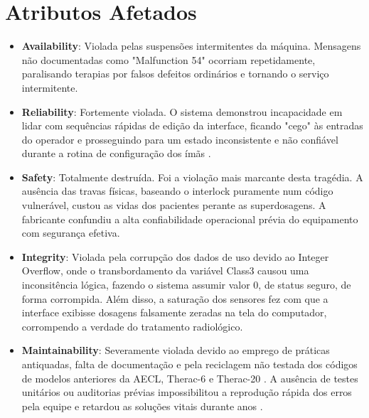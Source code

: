 \documentclass[12pt,a4paper]{article}
\begin{document}
\section*{Atributos Afetados}
\begin{itemize}
    \item \textbf{Availability}: Violada pelas suspensões intermitentes da máquina. Mensagens não documentadas como "Malfunction 54" ocorriam repetidamente, paralisando terapias por falsos defeitos ordinários e tornando o serviço intermitente.  
    \item \textbf{Reliability}: Fortemente violada. O sistema demonstrou incapacidade em lidar com sequências rápidas de edição da interface, ficando "cego" às entradas do operador e prosseguindo para um estado inconsistente e não confiável durante a rotina de configuração dos ímãs \cite{mit_investigation}.  
    \item \textbf{Safety}: Totalmente destruída. Foi a violação mais marcante desta tragédia. A ausência das travas físicas, baseando o interlock puramente num código vulnerável, custou as vidas dos pacientes perante as superdosagens. A fabricante confundiu a alta confiabilidade operacional prévia do equipamento com segurança efetiva.  
    \item \textbf{Integrity}: Violada pela corrupção dos dados de uso devido ao Integer Overflow, onde o transbordamento da variável Class3 causou uma inconsitência lógica, fazendo o sistema assumir valor $0$, de status seguro, de forma corrompida. Além disso, a saturação dos sensores fez com que a interface exibisse dosagens falsamente zeradas na tela do computador, corrompendo a verdade do tratamento radiológico.
    \item \textbf{Maintainability}: Severamente violada devido ao emprego de práticas antiquadas, falta de documentação e pela reciclagem não testada dos códigos de modelos anteriores da AECL, Therac-6 e Therac-20 \cite{wiki_therac, mit_investigation}. A ausência de testes unitários ou auditorias prévias impossibilitou a reprodução rápida dos erros pela equipe e retardou as soluções vitais durante anos \cite{harvard_investigation}.
\end{itemize}



\end{document}
